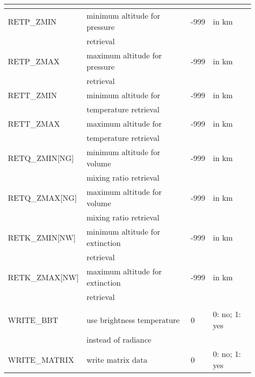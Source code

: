 \begin{table*}
\begin{tabular}{|l|l|l|l|}
\multicolumn{4}{l}{\cellcolor[RGB]{255,204,230}{Retrieval interface}} \\
\hline
RETP\_ZMIN     & minimum altitude for pressure   & -999 & in km \\
               & retrieval                       &      & \\
RETP\_ZMAX     & maximum altitude for pressure   & -999 & in km \\
               & retrieval                       &      & \\
RETT\_ZMIN     & minimum altitude for            & -999 & in km \\
               & temperature retrieval           &      & \\
RETT\_ZMAX     & maximum altitude for            & -999 & in km \\
               & temperature retrieval           &      & \\
RETQ\_ZMIN[NG] & minimum altitude for volume     & -999 & in km \\
               & mixing ratio retrieval          &      & \\
RETQ\_ZMAX[NG] & maximum altitude for volume     & -999 & in km \\
               & mixing ratio retrieval          &      & \\
RETK\_ZMIN[NW] & minimum altitude for extinction & -999 & in km \\
               & retrieval                       &      & \\
RETK\_ZMAX[NW] & maximum altitude for extinction & -999 & in km \\
               & retrieval                       &      & \\
\hline
\hline

\multicolumn{4}{l}{\cellcolor[RGB]{255,204,230}{Output flags}} \\
\hline
WRITE\_BBT     & use brightness temperature   & 0  & 0: no; 1: yes  \\
               & instead of radiance          &    & \\   
WRITE\_MATRIX  & write matrix data            & 0  & 0: no; 1: yes  \\
\hline
\end{tabular}
\label{tab:Control2}
\end{table*}


